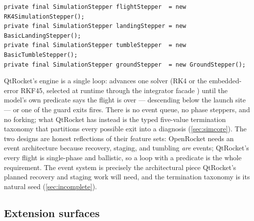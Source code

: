\begin{listing}[htbp]
\begin{verbatim}
private final SimulationStepper flightStepper  = new RK4SimulationStepper();
private final SimulationStepper landingStepper = new BasicLandingStepper();
private final SimulationStepper tumbleStepper  = new BasicTumbleStepper();
private final SimulationStepper groundStepper  = new GroundStepper();
\end{verbatim}
\caption{The four phase steppers of OpenRocket's event-driven engine, quoted from
 at tag . The engine swaps
steppers as events change the flight phase; the fidelity of the dynamics is a per-phase
decision, not a global one.}\label{lst:or-architecture-steppers}
\end{listing}

QtRocket's engine is a single loop: 
 advances one solver (RK4 or the embedded-error RKF45, selected
at runtime through the integrator facade ) until the model's own
predicate says the flight is over --- descending below the launch site
 --- or one of the guard exits fires. There is no event
queue, no phase steppers, and no forking; what QtRocket has instead is the typed
five-value termination taxonomy  that partitions every possible
exit into a diagnosis (\cref{sec:simcore}). The two designs are honest reflections of their
feature sets: OpenRocket needs an event architecture because recovery, staging, and
tumbling \emph{are} events; QtRocket's every flight is single-phase and ballistic, so a
loop with a predicate is the whole requirement. The event system is precisely the
architectural piece QtRocket's planned recovery and staging work will need, and the
termination taxonomy is its natural seed (\cref{sec:incomplete}).

\subsection{Extension surfaces}\label{app:or-architecture-ext}

